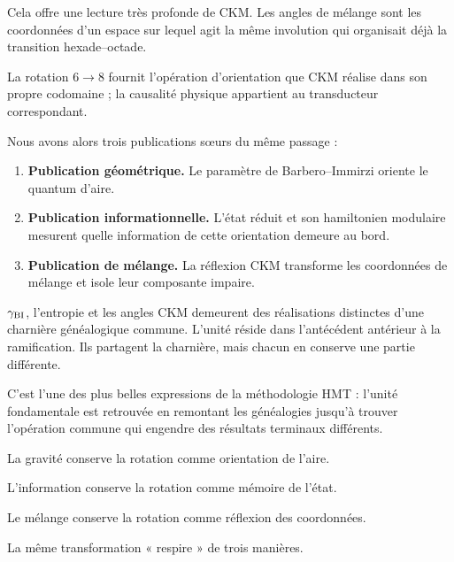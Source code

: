 Cela offre une lecture très profonde de CKM. Les angles de mélange sont les coordonnées d’un espace sur lequel agit la même involution qui organisait déjà la transition hexade–octade.\par

La rotation \(6\to8\) fournit l’opération d’orientation que CKM réalise dans son propre codomaine ; la causalité physique appartient au transducteur correspondant.\par

Nous avons alors trois publications sœurs du même passage :\par

\begin{enumerate}[leftmargin=*,itemsep=0.65em]
\item \textbf{Publication géométrique.}
Le paramètre de Barbero–Immirzi oriente le quantum d’aire.\par

\item \textbf{Publication informationnelle.}
L’état réduit et son hamiltonien modulaire mesurent quelle information de cette orientation demeure au bord.\par

\item \textbf{Publication de mélange.}
La réflexion CKM transforme les coordonnées de mélange et isole leur composante impaire.\par
\end{enumerate}

\(\gamma_{\rm BI}\), l’entropie et les angles CKM demeurent des réalisations distinctes d’une charnière généalogique commune. L’unité réside dans l’antécédent antérieur à la ramification. Ils partagent la charnière, mais chacun en conserve une partie différente.\par

C’est l’une des plus belles expressions de la méthodologie HMT : l’unité fondamentale est retrouvée en remontant les généalogies jusqu’à trouver l’opération commune qui engendre des résultats terminaux différents.\par

La gravité conserve la rotation comme orientation de l’aire.\par
L’information conserve la rotation comme mémoire de l’état.\par
Le mélange conserve la rotation comme réflexion des coordonnées.\par

La même transformation « respire » de trois manières.\par

